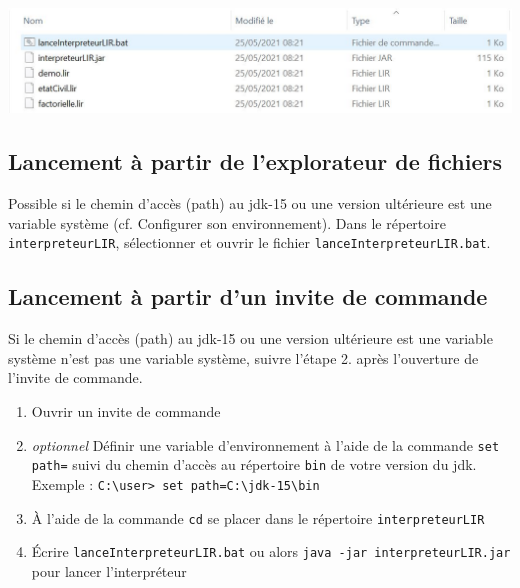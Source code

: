     \begin{flushleft}
        \includegraphics[width=\linewidth]{./img/installation-prototype.JPG}
    \end{flushleft}

    \subsection{Lancement à partir de l'explorateur de fichiers}
    Possible si le chemin d'accès (path) au jdk-15 ou une version
    ultérieure est une variable système (cf. Configurer son environnement).
    Dans le répertoire \verb|interpreteurLIR|, sélectionner et ouvrir le fichier
    \verb|lanceInterpreteurLIR.bat|.

    \subsection{Lancement à partir d'un invite de commande}

    Si le chemin d'accès (path) au jdk-15 ou une version ultérieure est
    une variable système n'est pas une variable système, suivre l'étape 2.
    après l'ouverture de l'invite de commande.

    \begin{enumerate}
        \item Ouvrir un invite de commande
        \item \textit{optionnel } Définir une variable d'environnement à l'aide
              de la commande \verb|set path=| suivi du chemin d'accès au répertoire
              \verb|bin| de votre version du jdk.
              \\ Exemple : \verb|C:\user> set path=C:\jdk-15\bin|
        \item À l'aide de la commande \verb|cd| se placer dans le répertoire
              \verb|interpreteurLIR|
        \item Écrire \verb|lanceInterpreteurLIR.bat| ou alors
              \verb|java -jar interpreteurLIR.jar| pour lancer l'interpréteur
    \end{enumerate}

